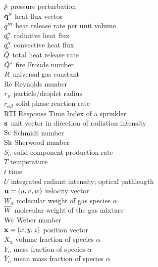 \begin{tabbing}
$\tilde{p}$                     \> pressure perturbation \\
$\dot{\mathbf{q}}''$                  \> heat flux vector \\
$\dot{q}'''$                  \> heat release rate per unit volume \\
$\dot{q}_{\rm r}''$           \> radiative heat flux \\
$\dot{q}_{\rm c}''$           \> convective heat flux \\
$\dot{Q}$                     \> total heat release rate \\
$\dot{Q}^*$                   \> fire Froude number \\
$R$                      \> universal gas constant \\
Re                        \> Reynolds number \\
$r_{\rm p}$               \> particle/droplet radius \\
$r_{\alpha\beta}$         \> solid phase reaction rate \\
RTI                       \> Response Time Index of a sprinkler \\
${\mathbf{s}}$                     \> unit vector in direction of radiation intensity \\
$\hbox{Sc}$                     \> Schmidt number \\
$\hbox{Sh}$                     \> Sherwood number \\
$S_\alpha$                \> solid component production rate \\
$T$                       \> temperature \\
$t$                       \> time           \\
$U$                       \> integrated radiant intensity; optical pathlength \\
${\mathbf{u}}=(u,v,w)$             \> velocity vector  \\
$W_\alpha$                \> molecular weight of gas species $\alpha$ \\
$\overline{W}$                     \> molecular weight of the gas mixture \\
$\hbox{We}$                     \> Weber number \\
${\mathbf{x}}=(x,y,z)$             \> position vector  \\
$X_\alpha$                \> volume fraction of species $\alpha$   \\
$Y_\alpha$                \> mass fraction of species $\alpha$   \\
$\bar{Y}_\alpha$          \> mean mass fraction of species $\alpha$   \\

\end{tabbing}

